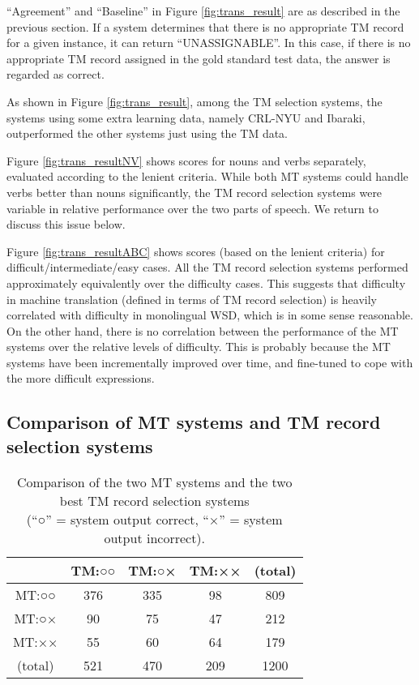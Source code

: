 ``Agreement'' and ``Baseline'' in Figure \ref{fig:trans_result} are as
described in the previous section.  If a system determines  that there
is no appropriate TM record for a given instance, it can return
``{\sc UNASSIGNABLE}''.  In this case, if there is no appropriate TM
record assigned in the gold standard test data, the answer is regarded
as correct.

As shown in Figure \ref{fig:trans_result}, among the TM selection
systems, the systems using some extra learning data, namely CRL-NYU and
Ibaraki, outperformed the other systems just using the TM data.

Figure \ref{fig:trans_resultNV} shows scores for nouns and verbs
separately, evaluated according to the lenient criteria.  While both MT
systems could handle verbs better than nouns significantly, the TM
record selection systems were variable in relative performance over the
two parts of speech.  We return to discuss this issue below.
 
Figure \ref{fig:trans_resultABC} shows scores (based on the lenient
criteria) for difficult/intermediate/easy cases.  All the TM record
selection systems performed approximately equivalently over the
difficulty cases.  This suggests that difficulty in machine translation
(defined in terms of TM record selection) is heavily correlated with
difficulty in monolingual WSD, which is in some sense reasonable.  On
the other hand, there is no correlation between the performance of the
MT systems over the relative levels of difficulty.  This is probably
because the MT systems have been incrementally improved over time,
and fine-tuned to cope with the more difficult expressions.



\subsection{Comparison of MT systems and TM record selection systems}

\begin{table}[t]
 \caption{Comparison of the two MT systems and the two best TM record selection
 systems \\ (``○'' = system output correct, ``×'' = system output incorrect).}  \label{tab:compare}
\begin{center}
 \begin{tabular}{c|ccc|c} \hline
       & TM:○○ &  TM:○× & TM:×× & (total) \\ \hline
MT:○○ &    376 &  335    & 98     &  809  \\
MT:○× &     90 &   75    & 47     &  212  \\
MT:×× &     55 &   60    & 64     &  179  \\ \hline
(total) &    521 &  470    & 209    & 1200  \\ \hline
 \end{tabular}
\end{center}
\end{table}

